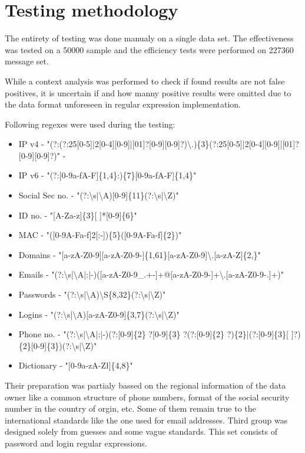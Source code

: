 \documentclass[a4paper,twoside,12pt]{book}
\begin{document}
\section{Testing methodology}

The entirety of testing was done manualy on a single data set. The effectiveness was tested on a 50000 sample and
the efficiency tests were performed on 227360 message set.

While a context analysis was performed to check if found results are not false positives, it is uncertain if and how manny
positive results were omitted due to the data format unforeseen in regular expression implementation. 

Following regexes were used during the testing: 

\begin{itemize}
   \item IP v4 - "(?:(?:25[0-5]|2[0-4][0-9]|[01]?[0-9][0-9]?)\textbackslash .)\{3\}(?:25[0-5]|2[0-4][0-9]|[01]?[0-9][0-9]?)" - 
   \item IP v6 - "(?:[0-9a-fA-F]\{1,4\}:)\{7\}[0-9a-fA-F]\{1,4\}"
   \item Social Sec no. - "(?:\textbackslash s|\textbackslash A)[0-9]\{11\}(?:\textbackslash s|\textbackslash Z)"
   \item ID no. - "[A-Za-z]\{3\}[ ]*[0-9]\{6\}"
   \item MAC - "([0-9A-Fa-f]{2}[:-])\{5\}([0-9A-Fa-f]\{2\})"
   \item Domains - "[a-zA-Z0-9][a-zA-Z0-9-]\{1,61\}[a-zA-Z0-9]\textbackslash .[a-zA-Z]\{2,\}"
   \item Emails - "(?:\textbackslash s|\textbackslash A|:|-)([a-zA-Z0-9\_.+-]+@[a-zA-Z0-9-]+\textbackslash .[a-zA-Z0-9-.]+)"
   \item Passwords - "(?:\textbackslash s|\textbackslash A)\textbackslash S\{8,32\}(?:\textbackslash s|\textbackslash Z)"
   \item Logins - "(?:\textbackslash s|\textbackslash A)[a-zA-Z0-9]\{3,7\}(?:\textbackslash s|\textbackslash Z)"
   \item Phone no. - "(?:\textbackslash s|\textbackslash A|:|-)(?:[0-9]\{2\} ?[0-9]\{3\} ?(?:[0-9]\{2\} ?)\{2\}|(?:[0-9]\{3\}[ ]?)\{2\}[0-9]\{3\})(?:\textbackslash s|\textbackslash Z)"
   \item Dictionary - "[0-9a-zA-Zł]\{4,8\}"
\end{itemize}

Their preparation was partialy bassed on the regional information of the data owner like a common structure of phone numbers, format of the social security number in the
country of orgin, etc. Some of them remain true to the international standards like the one used for email addresses. Third group was designed solely from guesses and
some vague standards. This set consists of password and login regular expressions.
\end{document}

